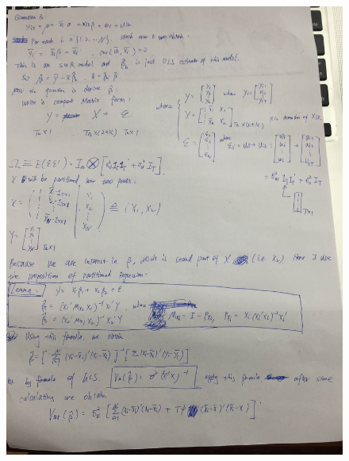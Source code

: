 \documentclass{article}
\begin{document}
\begin{figure}[H]
\centering
\includegraphics[width=1\linewidth]{Q3}
\caption{}
\label{fig:Q3}
\end{figure}
\end{document}
